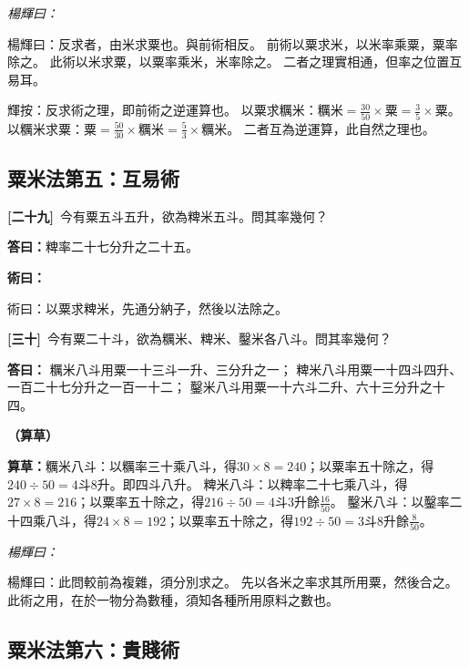 \documentclass[11pt,a4paper]{article}
\newenvironment{method}{%
  \par\noindent\textcolor{methodcolor}{\textbf{術曰：}}%
  \ignorespaces
}{\par\vspace{0.5em}}
\newenvironment{caocao}{%
  \par\noindent\textcolor{caocaocolor}{\small\textbf{（算草）}}%
  \ignorespaces
}{\par\vspace{0.5em}}
\newenvironment{yanghuicomment}{%
  \par\noindent\textcolor{commentarycolor}{\small\textit{楊輝曰：}}%
  \ignorespaces
}{\par\vspace{0.5em}}
\newcommand{\problemnum}[1]{\textbf{[\ignorespaces#1\unskip]}}
\begin{document}
\begin{yanghuicomment}
楊輝曰：反求者，由米求粟也。與前術相反。
前術以粟求米，以米率乘粟，粟率除之。
此術以米求粟，以粟率乘米，米率除之。
二者之理實相通，但率之位置互易耳。

輝按：反求術之理，即前術之逆運算也。
以粟求糲米：$糲米 = \frac{30}{50} \times 粟 = \frac{3}{5} \times 粟$。
以糲米求粟：$粟 = \frac{50}{30} \times 糲米 = \frac{5}{3} \times 糲米$。
二者互為逆運算，此自然之理也。
\end{yanghuicomment}

\subsection{粟米法第五：互易術}

\noindent\problemnum{二十九}\,
今有粟五斗五升，欲為粺米五斗。問其率幾何？

\noindent\textcolor{answercolor}{\textbf{答曰：}}粺率二十七分升之二十五。

\begin{method}
術曰：以粟求粺米，先通分納子，然後以法除之。
\end{method}

\noindent\problemnum{三十}\,
今有粟二十斗，欲為糲米、粺米、鑿米各八斗。問其率幾何？

\noindent\textcolor{answercolor}{\textbf{答曰：}}
糲米八斗用粟一十三斗一升、三分升之一；
粺米八斗用粟一十四斗四升、一百二十七分升之一百一十二；
鑿米八斗用粟一十六斗二升、六十三分升之十四。

\begin{caocao}
\textbf{算草：}糲米八斗：以糲率三十乘八斗，得$30 \times 8 = 240$；以粟率五十除之，得$240 \div 50 = 4$斗$8$升。即四斗八升。
粺米八斗：以粺率二十七乘八斗，得$27 \times 8 = 216$；以粟率五十除之，得$216 \div 50 = 4$斗$3$升餘$\frac{16}{50}$。
鑿米八斗：以鑿率二十四乘八斗，得$24 \times 8 = 192$；以粟率五十除之，得$192 \div 50 = 3$斗$8$升餘$\frac{8}{50}$。
\end{caocao}

\begin{yanghuicomment}
楊輝曰：此問較前為複雜，須分別求之。
先以各米之率求其所用粟，然後合之。
此術之用，在於一物分為數種，須知各種所用原料之數也。
\end{yanghuicomment}

\subsection{粟米法第六：貴賤術}
\end{document}
